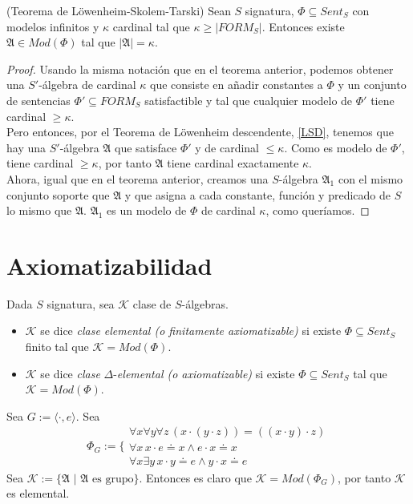 \begin{theorem}(Teorema de Löwenheim-Skolem-Tarski) Sean $S$ signatura, $\Phi \subseteq Sent_S$ con modelos infinitos y $\kappa$ cardinal tal que $\kappa \geq |FORM_S|$. Entonces existe $\mathfrak{A} \in Mod(\Phi)$ tal que $|\mathfrak{A}| = \kappa$.
\end{theorem}
\begin{proof}
Usando la misma notación que en el teorema anterior, podemos obtener una $S'$-álgebra de cardinal $\kappa$ que consiste en añadir constantes a $\Phi$ y un conjunto de sentencias $\Phi'\subseteq FORM_S$ satisfactible y tal que cualquier modelo de $\Phi'$ tiene cardinal $\geq\kappa$.\\

Pero entonces, por el Teorema de Löwenheim descendente, \ref{LSD}, tenemos que hay una $S'$-álgebra $\mathfrak{A}$ que satisface $\Phi'$ y de cardinal $\leq\kappa$. Como es modelo de $\Phi'$, tiene cardinal $\geq\kappa$, por tanto $\mathfrak{A}$ tiene  cardinal exactamente $\kappa$.\\

Ahora, igual que en el teorema anterior, creamos una $S$-álgebra $\mathfrak{A}_1$ con el mismo conjunto soporte que $\mathfrak{A}$ y que asigna a cada constante, función y predicado de $S$ lo mismo que $\mathfrak{A}$. $\mathfrak{A}_1$ es un modelo de $\Phi$ de cardinal $\kappa$, como queríamos.
\end{proof}

\section{Axiomatizabilidad}

\begin{defs}
Dada $S$ signatura, sea $\mathcal{K}$ clase de $S$-álgebras.
\mbox{}
\begin{itemize}
    \item $\mathcal{K}$ se dice \textit{clase elemental (o finitamente axiomatizable)} si existe $\Phi \subseteq Sent_S$ finito tal que $\mathcal{K} = Mod(\Phi)$.
    \item $\mathcal{K}$ se dice \textit{clase} $\Delta$-\textit{elemental (o axiomatizable)} si existe $\Phi \subseteq Sent_S$ tal que $\mathcal{K} = Mod(\Phi)$.
\end{itemize}
\end{defs}

\begin{example}
Sea $G := \langle \cdot, e \rangle$. Sea 
\[
    \Phi_G := \Bigg\{\begin{array}{lr}
       \forall x \forall y \forall z \, (x \cdot(y\cdot z))= ((x \cdot y) \cdot z)\\
       \forall x \, x\cdot e \doteq x\land e \cdot x \doteq x\\
        \forall x \exists y \, x\cdot y \doteq e \land y\cdot x \doteq e
        \end{array} 
\]
Sea $\mathcal{K}:=\{\mathfrak{A} \, \, | \, \, \mathfrak{A} \text{ es grupo}\}$. Entonces es claro que $\mathcal{K} = Mod(\Phi_G)$, por tanto $\mathcal{K}$ es elemental.
\end{example}

